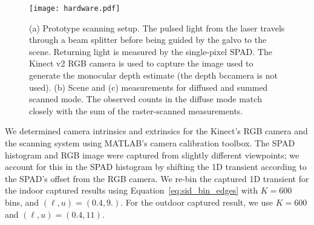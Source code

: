 
\begin{figure}[t]
	\centering
  \texttt{[image: hardware.pdf]}
  \caption{(a) Prototype scanning setup. The pulsed light from the laser travels
    through a beam splitter before being guided by the galvo to the scene.
    Returning light is measured by the single-pixel SPAD. The Kinect v2 RGB 
    camera is used to capture the image used to generate the monocular depth estimate
    (the depth bccamera is not used). (b) Scene and (c) measurements for diffused and summed scanned mode. The observed
    counts in the diffuse mode match closely with the sum of the raster-scanned
    measurements.}
  \label{fig:hardware}
\end{figure}

We determined camera intrinsics and extrinsics for the Kinect's RGB camera and
the scanning system using MATLAB's camera calibration toolbox. 
The SPAD histogram and RGB image were captured from slightly different
viewpoints; we account for this in the SPAD histogram by shifting the 1D
transient according to the SPAD's offset from the RGB camera. We re-bin the
captured 1D transient for the indoor captured results
using Equation~\ref{eq:sid_bin_edges} with $K = 600$ bins, and $(\ell, u)=(0.4, 9.)$.
For the outdoor captured result, we use $K=600$ and $(\ell, u)=(0.4, 11)$.

